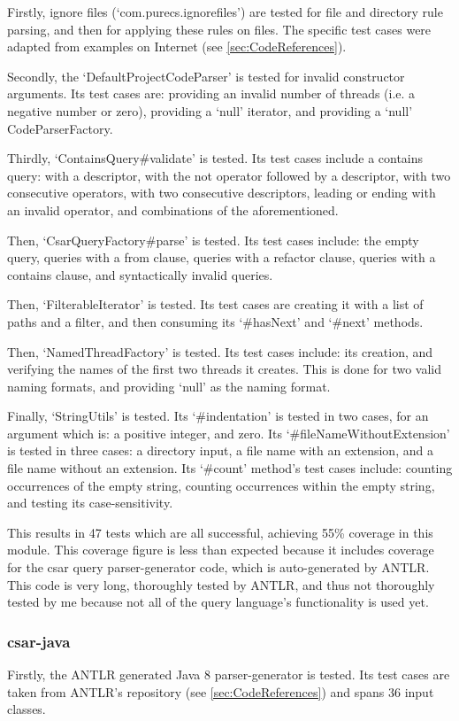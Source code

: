 \documentclass[12pt, letterpaper]{article}
\begin{document}
Firstly, ignore files (`com.purecs.ignorefiles') are tested for file and directory rule parsing, and then for applying these rules on files.
The specific test cases were adapted from examples on Internet (see \ref{sec:CodeReferences}).

Secondly, the `DefaultProjectCodeParser' is tested for invalid constructor arguments.
Its test cases are: providing an invalid number of threads (i.e. a negative number or zero), providing a `null' iterator, and providing a `null' CodeParserFactory.

Thirdly, `ContainsQuery\#validate' is tested.
Its test cases include a contains query: with a descriptor, with the not operator followed by a descriptor, with two consecutive operators, with two consecutive descriptors, leading or ending with an invalid operator, and combinations of the aforementioned.

Then, `CsarQueryFactory\#parse' is tested.
Its test cases include: the empty query, queries with a from clause, queries with a refactor clause, queries with a contains clause, and syntactically invalid queries.

Then, `FilterableIterator' is tested.
Its test cases are creating it with a list of paths and a filter, and then consuming its `\#hasNext' and `\#next' methods.

Then, `NamedThreadFactory' is tested.
Its test cases include: its creation, and verifying the names of the first two threads it creates.
This is done for two valid naming formats, and providing `null' as the naming format.

Finally, `StringUtils' is tested.
Its `\#indentation' is tested in two cases, for an argument which is: a positive integer, and zero.
Its `\#fileNameWithoutExtension' is tested in three cases: a directory input, a file name with an extension, and a file name without an extension.
Its `\#count' method's test cases include: counting occurrences of the empty string, counting occurrences within the empty string, and testing its case-sensitivity.

This results in 47 tests which are all successful, achieving 55\% coverage in this module.
This coverage figure is less than expected because it includes coverage for the csar query parser-generator code, which is auto-generated by ANTLR.
This code is very long, thoroughly tested by ANTLR, and thus not thoroughly tested by me because not all of the query language's functionality is used yet.

\subsubsection{csar-java}
Firstly, the ANTLR generated Java 8 parser-generator is tested.
Its test cases are taken from ANTLR's repository (see \ref{sec:CodeReferences}) and spans 36 input classes.
\end{document}
